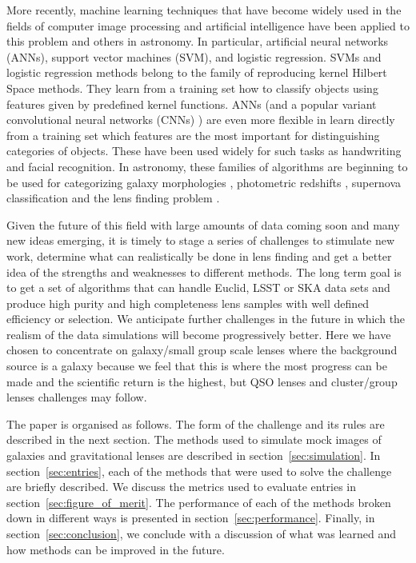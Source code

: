\documentclass{aa}
\begin{document}
More recently, machine learning techniques that have become widely used in the fields of computer image processing and artificial intelligence have been applied to this problem and others in astronomy.  In particular, artificial neural networks (ANNs), support vector machines (SVM), and logistic regression.  SVMs and logistic regression methods belong to the family of reproducing kernel Hilbert Space methods. They learn from a training set how to classify objects using features given by predefined kernel functions.  ANNs (and a popular variant convolutional neural networks (CNNs) ) are even more flexible in learn directly from a training set which features are the most important for distinguishing categories of objects.  These have been used widely for such tasks as handwriting and facial recognition.  In astronomy, these families of algorithms are beginning to be used for categorizing galaxy morphologies \citep{2015MNRAS.450.1441D}, photometric redshifts \citep{2017MNRAS.465.1959C,2016PASP..128j4502S,2017NewA...51..169S}, supernova classification \citep{2016ApJS..225...31L} and the lens finding problem \citep{2017MNRAS.471..167J,2017arXiv170207675P,2017MNRAS.465.4325O,2017AandA...597A.135B,hartley2017support}.

Given the future of this field with large amounts of data coming soon and many new ideas emerging, it is timely to stage a series of challenges to stimulate new work, determine what can realistically be done in lens finding and get a better idea of the strengths and weaknesses to different methods.  The long term goal is to get a set of algorithms that can handle Euclid, LSST or SKA data sets and produce high purity and high completeness lens samples with well defined efficiency or selection.  We anticipate further challenges in the future in which the realism of the data simulations will become progressively better.  Here we have chosen to concentrate on galaxy/small group scale lenses where the background source is a galaxy because we feel that this is where the most progress can be made and the scientific return is the highest, but QSO lenses and cluster/group lenses challenges may follow.

The paper is organised as follows.  The form of the challenge and its rules are described in the next section.  The methods used to simulate mock images of galaxies and gravitational lenses are described in section~\ref{sec:simulation}.  In section~\ref{sec:entries}, each of the methods that were used to solve the challenge are briefly described.  We discuss the metrics used to evaluate entries in section~\ref{sec:figure_of_merit}.  The performance of each of the methods broken down in different ways is presented in section~\ref{sec:performance}.  Finally,  in section~\ref{sec:conclusion}, we conclude with a discussion of what was learned and how methods can be improved in the future.
\end{document}
